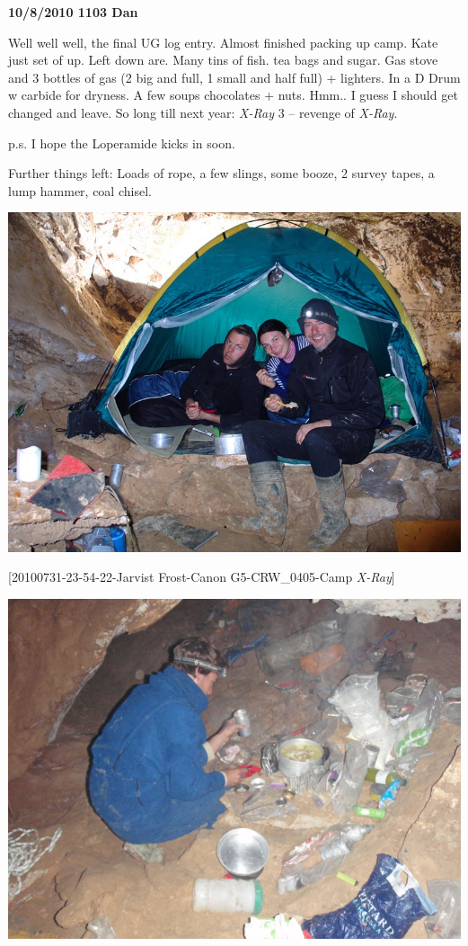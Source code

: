 \textbf{10/8/2010 1103 Dan}

Well well well, the final UG log entry. Almost finished packing up camp.
Kate just set of up. Left down are. Many tins of fish. tea bags and
sugar. Gas stove and 3 bottles of gas (2 big and full, 1 small and half
full) + lighters. In a D Drum w carbide for dryness. A few soups
chocolates + nuts. Hmm.. I guess I should get changed and leave. So long
till next year: \emph{X-Ray} 3 -- revenge of \emph{X-Ray}.

p.s. I hope the Loperamide kicks in soon.

Further things left: Loads of rope, a few slings, some booze, 2 survey
tapes, a lump hammer, coal chisel.

\includegraphics{UgLog1012/22.png}

{[}20100731-23-54-22-Jarvist Frost-Canon G5-CRW\_0405-Camp
\emph{X-Ray}{]}

\includegraphics{UgLog1012/23.png}

